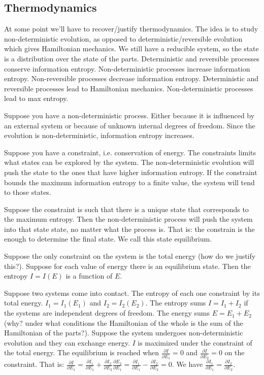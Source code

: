 \documentclass[11pt,letterpaper,fleqn]{memoir} %
\begin{document}
\subsection{Thermodynamics}

At some point we'll have to recover/justify thermodynamics. The idea is to study non-deterministic evolution, as opposed to deterministic/reversible evolution which gives Hamiltonian mechanics. We still have a reducible system, so the state is a distribution over the state of the parts. Deterministic and reversible processes conserve information entropy. Non-deterministic processes increase information entropy. Non-reversible processes decrease information entropy. Deterministic and reversible processes lead to Hamiltonian mechanics. Non-deterministic processes lead to max entropy.

Suppose you have a non-deterministic process. Either because it is influenced by an external system or because of unknown internal degrees of freedom. Since the evolution is non-deterministic, information entropy increases.

Suppose you have a constraint, i.e. conservation of energy. The constraints limits what states can be explored by the system. The non-deterministic evolution will push the state to the ones that have higher information entropy. If the constraint bounds the maximum information entropy to a finite value, the system will tend to those states.

Suppose the constraint is such that there is a unique state that corresponds to the maximum entropy. Then the non-deterministic process will push the system into that state state, no matter what the process is. That is: the constrain is the enough to determine the final state. We call this state equilibrium.

Suppose the only constraint on the system is the total energy (how do we justify this?). Suppose for each value of energy there is an equilibrium state. Then the entropy $I=I(E)$ is a function of $E$.

Suppose two systems come into contact. The entropy of each one constraint by its total energy. $I_1=I_1(E_1)$ and $I_2=I_2(E_2)$. The entropy sums $I=I_1+I_2$ if the systems are independent degrees of freedom. The energy sums $E=E_1+E_2$ (why? under what conditions the Hamiltonian of the whole is the sum of the Hamiltonian of the parts?). Suppose the system undergoes non-deterministic evolution and they can exchange energy. $I$ is maximized under the constraint of the total energy. The equilibrium is reached when $\frac{\partial I}{\partial E_1} = 0$ and $\frac{\partial I}{\partial E_2} = 0$ on the constraint. That is: $\frac{\partial I}{\partial E_1} = \frac{\partial I_1}{\partial E_1} +\frac{\partial I_2}{\partial E_2} \frac{\partial E_2}{\partial E_1} = \frac{\partial I_1}{\partial E_1} -\frac{\partial I_2}{\partial E_2}=0$. We have $\frac{\partial I_1}{\partial E_1} = \frac{\partial I_2}{\partial E_2}$.
\end{document}

